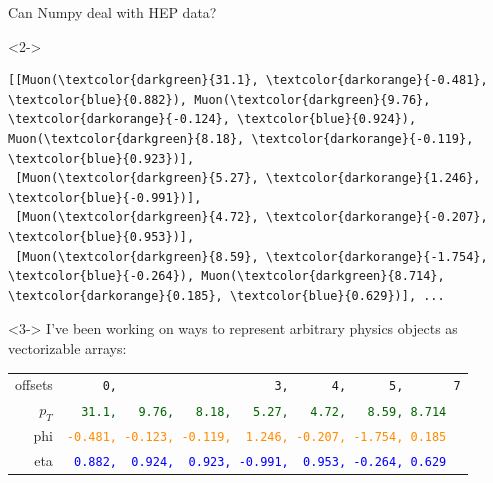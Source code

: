 \documentclass[aspectratio=169]{beamer}
\begin{document}
\begin{frame}[fragile]{Can Numpy deal with HEP data?}
\vspace{0.25 cm}
\begin{uncoverenv}<2->
\scriptsize
\begin{Verbatim}[commandchars=\\\{\}]
[[Muon(\textcolor{darkgreen}{31.1}, \textcolor{darkorange}{-0.481}, \textcolor{blue}{0.882}), Muon(\textcolor{darkgreen}{9.76}, \textcolor{darkorange}{-0.124}, \textcolor{blue}{0.924}), Muon(\textcolor{darkgreen}{8.18}, \textcolor{darkorange}{-0.119}, \textcolor{blue}{0.923})],
 [Muon(\textcolor{darkgreen}{5.27}, \textcolor{darkorange}{1.246}, \textcolor{blue}{-0.991})],
 [Muon(\textcolor{darkgreen}{4.72}, \textcolor{darkorange}{-0.207}, \textcolor{blue}{0.953})],
 [Muon(\textcolor{darkgreen}{8.59}, \textcolor{darkorange}{-1.754}, \textcolor{blue}{-0.264}), Muon(\textcolor{darkgreen}{8.714}, \textcolor{darkorange}{0.185}, \textcolor{blue}{0.629})], ...
\end{Verbatim}
\end{uncoverenv}

\begin{uncoverenv}<3->
\normalsize
I've been working on ways to represent arbitrary physics objects as vectorizable arrays:

\vspace{0.1 cm}
\begin{tabular}{r l}
\small offsets &                    {\tt\scriptsize \ \ \ \ \ 0,\ \ \ \ \ \ \ \ \ \ \ \ \ \ \ \ \ \ \ \ \ \ 3,\ \ \ \ \ \ 4,\ \ \ \ \ \ 5,\ \ \ \ \ \ \ 7} \\
\small $p_T$ & \textcolor{darkgreen}{\tt\scriptsize \ \ 31.1,\ \ \ 9.76,\ \ \ 8.18,\ \ \ 5.27,\ \ \ 4.72,\ \ \ 8.59, 8.714} \\
\small phi &  \textcolor{darkorange}{\tt\scriptsize -0.481,\ -0.123,\ -0.119,\ \ 1.246,\ -0.207,\ -1.754,\ 0.185} \\
\small eta &        \textcolor{blue}{\tt\scriptsize \ 0.882,\ \ 0.924,\ \ 0.923,\ -0.991,\ \ 0.953,\ -0.264,\ 0.629} \\
\end{tabular}
\end{uncoverenv}
\end{frame}
\end{document}
